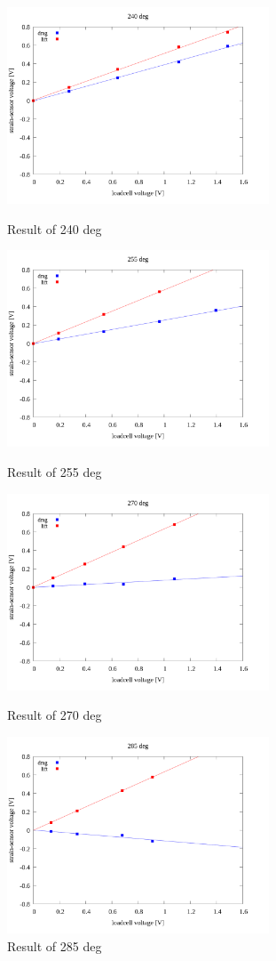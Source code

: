 \documentclass[twocolumn,a4j]{jsarticle}
\begin{document}
\begin{figure}[htbp]
    \footnotesize
    \begin{center}
        \includegraphics[width=78mm]{../images/linear/240_linear.png}
        \caption{Result of 240 deg}
        \includegraphics[width=78mm]{../images/linear/255_linear.png}
        \caption{Result of 255 deg}
        \includegraphics[width=78mm]{../images/linear/270_linear.png}
        \caption{Result of 270 deg}
        \includegraphics[width=78mm]{../images/linear/285_linear.png}
        \caption{Result of 285 deg}
    \end{center}
\end{figure}
\end{document}

